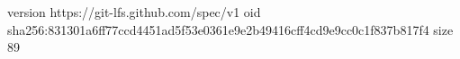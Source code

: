 version https://git-lfs.github.com/spec/v1
oid sha256:831301a6ff77ccd4451ad5f53e0361e9e2b49416cff4cd9e9cc0c1f837b817f4
size 89
